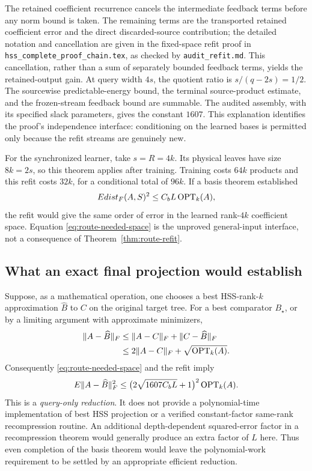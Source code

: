 \documentclass[11pt,oneside,openany,a4paper]{report}
\numberwithin{equation}{chapter}
\theoremstyle{definition}
\theoremstyle{remark}
\newcommand{\sourcefile}[1]{{\small\nolinkurl{#1}}}
\begin{document}
The retained coefficient recurrence cancels the intermediate feedback
terms before any norm bound is taken.  The remaining terms are the
transported retained coefficient error and the direct discarded-source
contribution; the detailed notation and cancellation are given in the
fixed-space refit proof in
\sourcefile{hss_complete_proof_chain.tex}, as checked by
\sourcefile{audit_refit.md}.  This cancellation, rather than a sum of
separately bounded feedback terms, yields the retained-output gain.  At
query width $4s$, the quotient ratio is
$s/(q-2s)=1/2$.  The sourcewise predictable-energy bound, the terminal
source-product estimate, and the frozen-stream feedback bound are
summable.  The audited assembly, with its specified slack parameters,
gives the constant $1607$.  This explanation identifies the proof's
independence interface: conditioning on the learned bases is permitted
only because the refit streams are genuinely new.

For the synchronized learner, take $s=R=4k$.  Its physical leaves have
size $8k=2s$, so this theorem applies after training.  Training costs
$64k$ products and this refit costs $32k$, for a conditional total of
$96k$.  If a basis theorem established
\begin{equation}
 \E\operatorname{dist}_F(A,\mathcal S)^2
 \leq C_b L\OPT_k(A),
 \label{eq:route-needed-space}
\end{equation}
the refit would give the same order of error in the learned rank-$4k$
coefficient space.  Equation \eqref{eq:route-needed-space} is the
unproved general-input interface, not a consequence of
Theorem~\ref{thm:route-refit}.

\subsection{What an exact final projection would establish}

Suppose, as a mathematical operation, one chooses a best HSS-rank-$k$
approximation $\widehat B$ to $C$ on the original target tree.  For a
best comparator $B_\star$, or by a limiting argument with approximate
minimizers,
\begin{align}
 \lVert A-\widehat B\rVert_F
 &\leq \lVert A-C\rVert_F+\lVert C-\widehat B\rVert_F\\
 &\leq2\lVert A-C\rVert_F+\sqrt{\OPT_k(A)}.
 \label{eq:route-offline-reduction}
\end{align}
Consequently \eqref{eq:route-needed-space} and the refit imply
\[
 \E\lVert A-\widehat B\rVert_F^2
 \leq \bigl(2\sqrt{1607C_bL}+1\bigr)^2\OPT_k(A).
\]
This is a \emph{query-only reduction}.  It does not provide a
polynomial-time implementation of best HSS projection or a verified
constant-factor same-rank recompression routine.  An additional
depth-dependent squared-error factor in a recompression theorem would
generally produce an extra factor of $L$ here.  Thus even completion of
the basis theorem would leave the polynomial-work requirement to be
settled by an appropriate efficient reduction.
\end{document}
